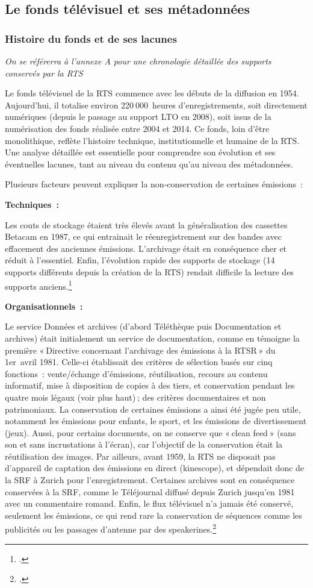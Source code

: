 \subsection{Le fonds télévisuel et ses métadonnées}

\subsubsection{Histoire du fonds et de ses lacunes}
\textit{On se référerra à l'annexe A pour une chronologie détaillée des supports conservés par la RTS}

Le fonds télévisuel de la RTS commence avec les débuts de la diffusion en 1954. Aujourd’hui, il totalise environ 220 000 heures d’enregistrements, soit directement numériques (depuis le passage au support LTO en 2008), soit issus de la numérisation des fonds réalisée entre 2004 et 2014. Ce fonds, loin d’être monolithique, reflète l’histoire technique, institutionnelle et humaine de la RTS. Une analyse détaillée est essentielle pour comprendre son évolution et ses éventuelles lacunes, tant au niveau du contenu qu’au niveau des métadonnées.

Plusieurs facteurs peuvent expliquer la non-conservation de certaines émissions :

\textbf{Techniques :}

Les couts de stockage étaient très élevés avant la généralisation des cassettes Betacam en 1987, ce qui entrainait le réenregistrement sur des bandes avec effacement des anciennes émissions. L’archivage était en conséquence cher et réduit à l’essentiel. Enfin, l’évolution rapide des supports de stockage (14 supports différents depuis la création de la RTS) rendait difficile la lecture des supports anciens.\footcite{barcella2024a}

\textbf{Organisationnels :}

Le service Données et archives (d’abord Téléthèque puis Documentation et archives) était initialement un service de documentation, comme en témoigne la première « Directive concernant l’archivage des émissions à la RTSR » du 1er avril 1981. Celle-ci établissait des critères de sélection basés sur cinq fonctions : vente/échange d’émissions, réutilisation, recours au contenu informatif, mise à disposition de copies à des tiers, et conservation pendant les quatre mois légaux (voir plus haut) ; des critères documentaires et non patrimoniaux. La conservation de certaines émissions a ainsi été jugée peu utile, notamment les émissions pour enfants, le sport, et les émissions de divertissement (jeux). Aussi, pour certains documents, on ne conserve que « clean feed » (sans son et sans incrustations à l’écran), car l’objectif de la conservation était la réutilisation des images.
Par ailleurs, avant 1959, la RTS ne disposait pas d’appareil de captation des émissions en direct (kinescope), et dépendait donc de la SRF à Zurich pour l’enregistrement. Certaines archives sont en conséquence conservées à la SRF, comme le Téléjournal diffusé depuis Zurich jusqu’en 1981 avec un commentaire romand. Enfin, le flux télévisuel n’a jamais été conservé, seulement les émissions, ce qui rend rare la conservation de séquences comme les publicités ou les passages d’antenne par des speakerines.\footcite{barcella2024a}

